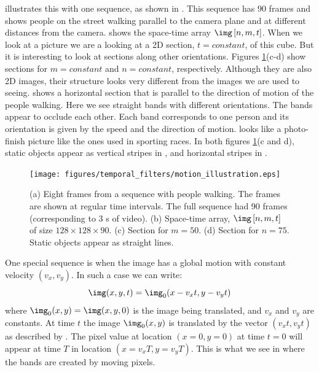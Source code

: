 \Fig{\ref{fig:motion}} illustrates this with one sequence, as shown in . This sequence has 90 frames and shows people on the street walking parallel to the camera plane and at different distances from the camera.  shows the space-time array $\img \left[n,m,t \right]$. When we look at a picture we are a looking at a 2D section, $t=constant$, of this cube. But it is interesting to look at sections along other orientations.  Figures \ref{fig:motion}(c-d) show sections for $m=constant$ and $n=constant$, respectively. Although they are also 2D images, their structure looks very different from the images we are used to seeing.  shows a horizontal section that is parallel to the direction of motion of the people walking. Here we see straight bands with different orientations. The bands appear to occlude each other. Each band corresponds to one person and its orientation is given by the speed and the direction of motion.  looks like a photo-finish picture like the ones used in sporting races. In both figures \ref{fig:motion}(c and d), static objects appear as vertical stripes in , and horizontal stripes in . 


\begin{figure}
\texttt{[image: figures/temporal\_filters/motion\_illustration.eps]}
\caption{(a) Eight frames from a sequence with people walking. The frames are shown at regular time intervals. The full sequence had 90 frames (corresponding to 3 s of video). (b) Space-time array, $\img \left[n,m,t \right]$ of size $128 \times 128 \times 90$. (c) Section for $m=50$. (d) Section for $n=75$. Static objects appear as straight lines.} 
\label{fig:motion}
\end{figure}


One special sequence is when the image has a global motion with constant velocity $(v_x,v_y)$. In such a case we can write:
\begin{equation}
\img (x,y,t) = \img_0 (x-v_x t,y-v_y t)
\label{eq:globaly_moving_image}
\end{equation}
where $\img_0(x,y)= \img (x,y,0)$ is the image being translated, and $v_x$ and $v_y$ are constants. At time $t$ the image $\img_0(x,y)$ is translated by the vector $(v_x t,v_y t)$ as described by \eqn{\ref{eq:globaly_moving_image}}. The pixel value at location $(x=0, y=0)$ at time $t=0$ will appear at time $T$ in location $(x=v_x T, y=v_y T)$.
This is what we see in  where the bands are created by moving pixels.

